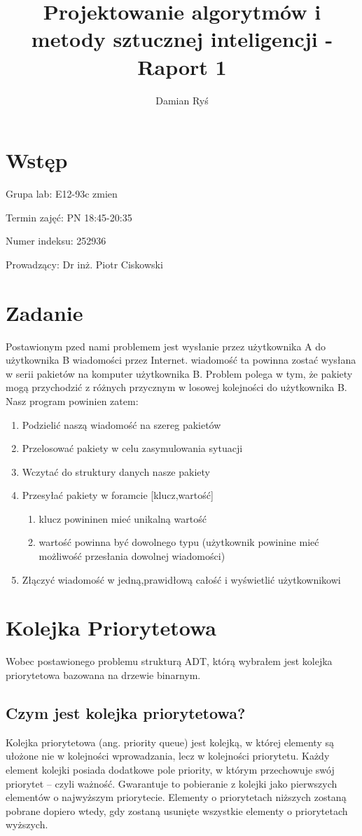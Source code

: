 \documentclass{article}
\title{Projektowanie algorytmów i metody sztucznej inteligencji - Raport 1}
\author{Damian Ryś}
\begin{document}
\maketitle


\tableofcontents
\section{Wstęp}
Grupa lab: E12-93c zmien

Termin zajęć: PN 18:45-20:35

Numer indeksu: 252936

Prowadzący: Dr inż. Piotr Ciskowski
\newpage
\section{Zadanie}
Postawionym pzed nami problemem jest wysłanie przez użytkownika A do użytkownika B wiadomości przez Internet.
wiadomość ta powinna zostać wysłana w serii pakietów na komputer użytkownika B.
Problem polega w tym, że pakiety mogą przychodzić z różnych przycznym w losowej kolejności do użytkownika B.
Nasz program powinien zatem:
\begin{enumerate}
    \item Podzielić naszą wiadomość na szereg pakietów
    \item Przelosować pakiety w celu zasymulowania sytuacji
    \item Wczytać do struktury danych nasze pakiety
    \item Przesyłać pakiety w foramcie [klucz,wartość]
    \begin{enumerate}
        \item klucz powininen mieć unikalną wartość
        \item wartość powinna być dowolnego typu (użytkownik powinine mieć możliwość przesłania dowolnej wiadomości)
    \end{enumerate}
    \item Złączyć wiadomość w jedną,prawidłową całość i wyświetlić użytkownikowi
\end{enumerate}
\section{Kolejka Priorytetowa}
Wobec postawionego problemu strukturą ADT, którą wybrałem jest kolejka priorytetowa bazowana na drzewie binarnym.
\subsection{Czym jest kolejka priorytetowa?}
Kolejka priorytetowa (ang. priority queue) jest kolejką, w której elementy są ułożone nie w kolejności wprowadzania, lecz w kolejności priorytetu.
Każdy element kolejki posiada dodatkowe pole priority, w którym przechowuje swój priorytet – czyli ważność.
Gwarantuje to pobieranie z kolejki jako pierwszych elementów o najwyższym priorytecie. 
Elementy o priorytetach niższych zostaną pobrane dopiero wtedy, gdy zostaną usunięte wszystkie elementy o priorytetach wyższych.
\end{document}

